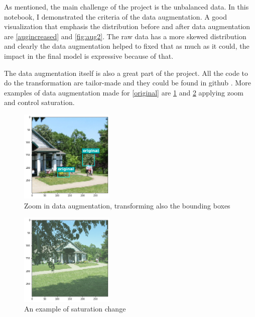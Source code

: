 \documentclass[11pt, a4paper, twocolumn]{article}
\begin{document}
As mentioned, the main challenge of the project is the unbalanced data. In this notebook, I demonstrated the criteria of the data augmentation. A good visualization that emphasis the distribution before and after data augmentation are \ref{augincreased} and \ref{fig:aug2}. The raw data has a more skewed distribution and clearly the data augmentation helped to fixed that as much as it could, the impact in the final model is expressive because of that.


The data augmentation itself is also a great part of the project. All the code to do the transformation are tailor-made and they could be found in github \cite{dataaugcode}. More examples of data augmentation made for \ref{original} are \ref{aug1plus} and \ref{aug2plus} applying zoom and control saturation.

\begin{figure}[!ht]
	\centering
	\includegraphics[width=0.4\textwidth]{aug-plus1.png}
	\caption{Zoom in data augmentation, transforming also the bounding boxes}
	\label{aug1plus}
\end{figure}

\begin{figure}[!ht]
	\centering
	\includegraphics[width=0.4\textwidth]{aug-plus2.png}
	\caption{An example of saturation change}
	\label{aug2plus}
\end{figure}
\end{document}
